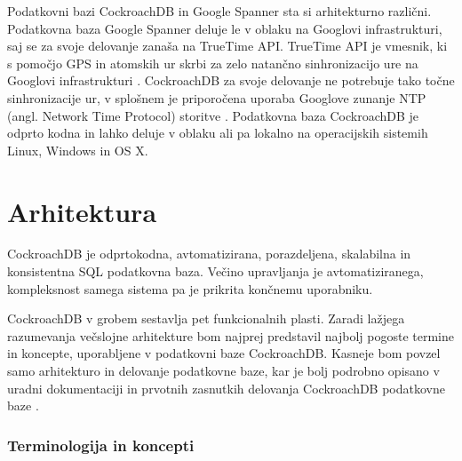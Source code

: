 \documentclass[a4paper, 12pt]{book}
\begin{document}
Podatkovni bazi CockroachDB in Google Spanner sta si arhitekturno različni. Podatkovna baza Google Spanner deluje le v oblaku na Googlovi infrastrukturi, saj se za svoje delovanje zanaša na TrueTime API. TrueTime API je vmesnik, ki s pomočjo GPS in atomskih ur skrbi za zelo natančno sinhronizacijo ure na Googlovi infrastrukturi \cite{Corbett:2013:SGG:2518037.2491245}. CockroachDB za svoje delovanje ne potrebuje tako točne sinhronizacije ur, v splošnem je priporočena uporaba Googlove zunanje NTP (angl. Network Time Protocol) storitve \cite{CRDB-ntpd-configuration}. Podatkovna baza CockroachDB je odprto kodna in lahko deluje v oblaku ali pa lokalno na operacijskih sistemih Linux, Windows in OS X.

\section{Arhitektura}

CockroachDB je odprtokodna, avtomatizirana, porazdeljena, skalabilna in konsistentna SQL podatkovna baza. Večino upravljanja je avtomatiziranega, kompleksnost samega sistema pa je prikrita končnemu uporabniku. 

CockroachDB v grobem sestavlja pet funkcionalnih plasti. Zaradi lažjega razumevanja večslojne arhitekture bom najprej predstavil najbolj pogoste termine in koncepte, uporabljene v podatkovni baze CockroachDB. Kasneje bom povzel samo arhitekturo in delovanje podatkovne baze, kar je bolj podrobno opisano v uradni dokumentaciji \cite{CRDB-home} in prvotnih zasnutkih delovanja CockroachDB podatkovne baze \cite{CRDB-design}.

\subsubsection{Terminologija in koncepti}
\end{document}

